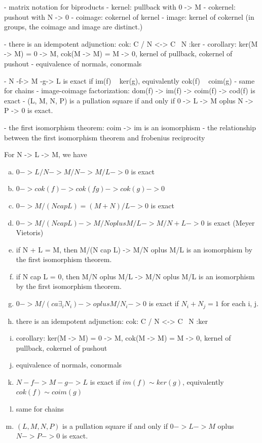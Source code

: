 \documentclass{book}
\theoremstyle{definition}
\begin{document}
- matrix notation for biproducts
- kernel: pullback with  0 -> M
- cokernel: pushout with N -> 0
- coimage: cokernel of kernel
- image: kernel of cokernel (in groups, the coimage and image are distinct.)

- there is an idempotent adjunction: cok: C / N <-> C \ N :ker
- corollary: ker(M -> M) = 0 -> M, cok(M -> M) = M -> 0, kernel of pullback, cokernel of pushout
- equivalence of normals, conormals

- N -f-> M -g-> L is exact if im(f) ~ ker(g), equivalently cok(f) ~ coim(g)
- same for chains
- image-coimage factorization: dom(f) -> im(f) -> coim(f) -> cod(f) is exact
- (L, M, N, P) is a pullation square if and only if 0 -> L -> M oplus N -> P -> 0 is exact.

- the first isomorphism theorem: coim -> im is an isomorphism
- the relationship between the first isomorphism theorem and frobenius reciprocity

For N -> L -> M, we have
\begin{enumerate}[(a)]
\item $0 -> L/N -> M/N -> M / L -> 0$ is exact
\item $0 -> cok(f) -> cok(fg) -> cok(g) -> 0$
\item $0 -> M/(N cap L) = (M+N)/L -> 0$ is exact
\item $0 -> M/(N cap L) -> M/N oplus M/L -> M / N+L -> 0$ is exact (Meyer Vietoris)
\item if N + L = M,  then M/(N cap L) -> M/N oplus M/L is an isomorphism by the first isomorphism theorem.
\item if N cap L = 0,  then M/N oplus M/L -> M/N oplus M/L is an isomorphism by the first isomorphism theorem.
\item $0 -> M/(ca∃_i N_i) -> oplus M/N_i -> 0$ is exact if $N_i + N_j = 1$ for each i, j.
\item there is an idempotent adjunction: cok: C / N <-> C \ N :ker
\item corollary: ker(M -> M) = 0 -> M, cok(M -> M) = M -> 0, kernel of pullback, cokernel of pushout
\item equivalence of normals, conormals
\item $N -f-> M -g-> L$ is exact if $im(f) \sim ker(g)$, equivalently $cok(f) \sim coim(g)$
\item same for chains
\item $(L, M, N, P)$ is a pullation square if and only if $0 -> L -> M$ oplus $N -> P -> 0$ is exact.
\end{enumerate}
\end{document}
